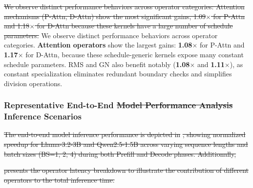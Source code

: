 \documentclass[manuscript,screen,review]{acmart}
\theoremstyle{indenteditalic}
\providecommand{\DIFaddtex}[1]{{\protect\color{blue}#1}} %
\providecommand{\DIFidentity}[1]{#1}
\providecommand{\DIFdeltex}[1]{{%
  \protect\color{red}%
  \normalfont\normalsize
  \let\textbf\DIFidentity
  \let\textit\DIFidentity
  \let\texttt\DIFidentity
  \let\textsc\DIFidentity
  \let\textsf\DIFidentity
  \let\emph\DIFidentity
  \let\uline\DIFidentity
  \sout{#1}%
}} %
\providecommand{\DIFaddbegin}{} %
\providecommand{\DIFaddend}{} %
\providecommand{\DIFdelbegin}{} %
\providecommand{\DIFdelend}{} %
\providecommand{\DIFadd}[1]{\texorpdfstring{\DIFaddtex{#1}}{#1}} %
\providecommand{\DIFdel}[1]{\texorpdfstring{\DIFdeltex{#1}}{}} %
\begin{document}
\DIFdelbegin\DIFdel{We observe distinct performance behaviors across operator categories: \textbf{Attention mechanisms} (P-Attn, D-Attn) show the most significant gains, \textbf{1.09$\times$} for P-Attn and \textbf{1.18$\times$} for D-Attn because these kernels have a large number of schedule parameters.}\DIFdelend{}\space
\DIFaddbegin\DIFadd{We observe distinct performance behaviors across operator categories. \textbf{Attention operators} show the largest gains: \textbf{1.08$\times$} for P-Attn and \textbf{1.17$\times$} for D-Attn, because these schedule-generic kernels expose many constant schedule parameters.}\DIFaddend{}\space
RMS and GN also benefit notably (\textbf{1.08$\times$} and \textbf{1.11$\times$}), as constant specialization eliminates redundant boundary checks and simplifies division operations.

\subsubsection{\DIFaddbegin \DIFadd{Representative }\DIFaddend End-to-End \DIFdelbegin \DIFdel{Model Performance Analysis}\DIFdelend \DIFaddbegin \DIFadd{Inference Scenarios}\DIFaddend}
\DIFdelbegin
\DIFdel{The end-to-end model inference performance is depicted in }%
\DIFdel{, showing normalized speedup for Llama-3.2-3B and Qwen2.5-1.5B across varying sequence lengths and batch sizes (BS=1, 2, 4) during both Prefill and Decode phases. Additionally, }%

\DIFdel{presents the operator latency breakdown to illustrate the contribution of different operators to the total inference time. }%

\DIFdelend
\end{document}
